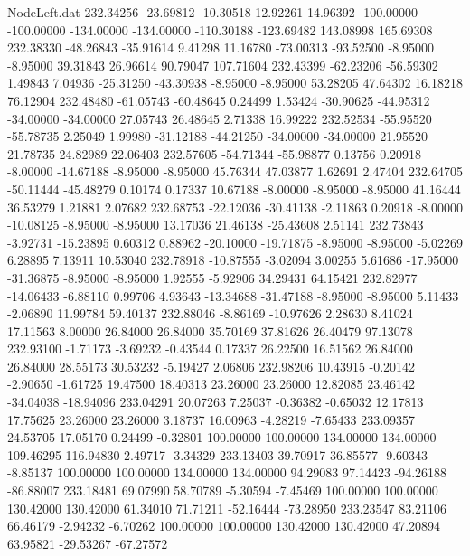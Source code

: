 \begin{filecontents}{NodeLeft.dat}
 232.34256  -23.69812  -10.30518    12.92261   14.96392 -100.00000 -100.00000 -134.00000 -134.00000 -110.30188 -123.69482  143.08998  165.69308
 232.38330  -48.26843  -35.91614     9.41298   11.16780  -73.00313  -93.52500   -8.95000   -8.95000   39.31843   26.96614   90.79047  107.71604
 232.43399  -62.23206  -56.59302     1.49843    7.04936  -25.31250  -43.30938   -8.95000   -8.95000   53.28205   47.64302   16.18218   76.12904
 232.48480  -61.05743  -60.48645     0.24499    1.53424  -30.90625  -44.95312  -34.00000  -34.00000   27.05743   26.48645    2.71338   16.99222
 232.52534  -55.95520  -55.78735     2.25049    1.99980  -31.12188  -44.21250  -34.00000  -34.00000   21.95520   21.78735   24.82989   22.06403
 232.57605  -54.71344  -55.98877     0.13756    0.20918   -8.00000  -14.67188   -8.95000   -8.95000   45.76344   47.03877    1.62691    2.47404
 232.64705  -50.11444  -45.48279     0.10174    0.17337   10.67188   -8.00000   -8.95000   -8.95000   41.16444   36.53279    1.21881    2.07682
 232.68753  -22.12036  -30.41138    -2.11863    0.20918   -8.00000  -10.08125   -8.95000   -8.95000   13.17036   21.46138  -25.43608    2.51141
 232.73843   -3.92731  -15.23895     0.60312    0.88962  -20.10000  -19.71875   -8.95000   -8.95000   -5.02269    6.28895    7.13911   10.53040
 232.78918  -10.87555   -3.02094     3.00255    5.61686  -17.95000  -31.36875   -8.95000   -8.95000    1.92555   -5.92906   34.29431   64.15421
 232.82977  -14.06433   -6.88110     0.99706    4.93643  -13.34688  -31.47188   -8.95000   -8.95000    5.11433   -2.06890   11.99784   59.40137
 232.88046   -8.86169  -10.97626     2.28630    8.41024   17.11563    8.00000   26.84000   26.84000   35.70169   37.81626   26.40479   97.13078
 232.93100   -1.71173   -3.69232    -0.43544    0.17337   26.22500   16.51562   26.84000   26.84000   28.55173   30.53232   -5.19427    2.06806
 232.98206   10.43915   -0.20142    -2.90650   -1.61725   19.47500   18.40313   23.26000   23.26000   12.82085   23.46142  -34.04038  -18.94096
 233.04291   20.07263    7.25037    -0.36382   -0.65032   12.17813   17.75625   23.26000   23.26000    3.18737   16.00963   -4.28219   -7.65433
 233.09357   24.53705   17.05170     0.24499   -0.32801  100.00000  100.00000  134.00000  134.00000  109.46295  116.94830    2.49717   -3.34329
 233.13403   39.70917   36.85577    -9.60343   -8.85137  100.00000  100.00000  134.00000  134.00000   94.29083   97.14423  -94.26188  -86.88007
 233.18481   69.07990   58.70789    -5.30594   -7.45469  100.00000  100.00000  130.42000  130.42000   61.34010   71.71211  -52.16444  -73.28950
 233.23547   83.21106   66.46179    -2.94232   -6.70262  100.00000  100.00000  130.42000  130.42000   47.20894   63.95821  -29.53267  -67.27572

\end{filecontents}
